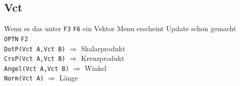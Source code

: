 \documentclass[12pt,a4paper,landscape]{article}
\def\g#1{\texttt{#1}}
\begin{document}
	 \subsection{Vct}
	 Wenn es das unter \g{F3} \g{F6} ein Vektor Menu erscheint Update schon gemacht\\
	 \g{OPTN} \g{F2}\\
	 \g{DotP(Vct A,Vct B)} $\Rightarrow$ Skalarprodukt\\
	 \g{CrsP(Vct A,Vct B)} $\Rightarrow$ Kreuzprodukt\\
	 \g{Angel(Vct A,Vct B)} $\Rightarrow$ Winkel\\
	 \g{Norm(Vct A)} $\Rightarrow$ L\"ange
	 
\end{document}
